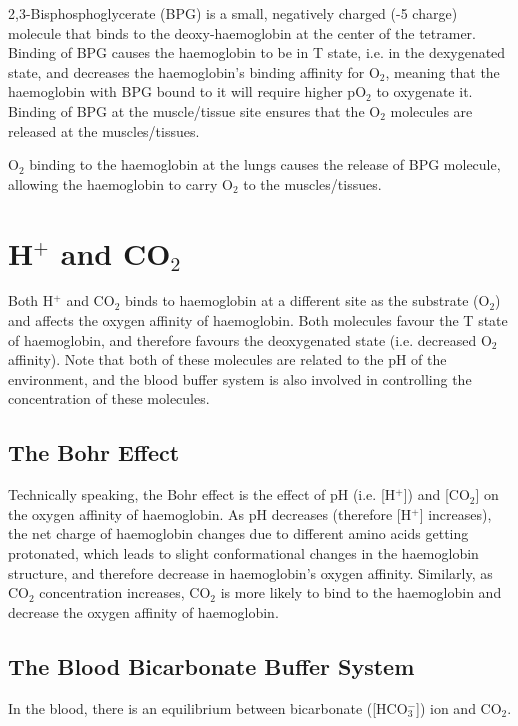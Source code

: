 \documentclass[a4paper, 12pt]{report}
\begin{document}
2,3-Bisphosphoglycerate (BPG) is a small, negatively charged (-5 charge) molecule that binds to the deoxy-haemoglobin at the center of the tetramer.
Binding of BPG causes the haemoglobin to be in T state, i.e. in the dexygenated state, and decreases the haemoglobin's binding affinity for O$_2$, meaning that the haemoglobin with BPG bound to it will require higher pO$_2$ to oxygenate it.
Binding of BPG at the muscle/tissue site ensures that the O$_2$ molecules are released at the muscles/tissues.

O$_2$ binding to the haemoglobin at the lungs causes the release of BPG molecule, allowing the haemoglobin to carry O$_2$ to the muscles/tissues.

\section{H$^+$ and CO$_2$}

Both H$^+$ and CO$_2$ binds to haemoglobin at a different site as the substrate (O$_2$) and affects the oxygen affinity of haemoglobin.
Both molecules favour the T state of haemoglobin, and therefore favours the deoxygenated state (i.e. decreased O$_2$ affinity).
Note that both of these molecules are related to the pH of the environment, and the blood buffer system is also involved in controlling the concentration of these molecules.

\subsection{The Bohr Effect}

Technically speaking, the Bohr effect is the effect of pH (i.e. [H$^+$]) and [CO$_2$] on the oxygen affinity of haemoglobin.
As pH decreases (therefore [H$^+$] increases), the net charge of haemoglobin changes due to different amino acids getting protonated, which leads to slight conformational changes in the haemoglobin structure, and therefore decrease in haemoglobin's oxygen affinity.
Similarly, as CO$_2$ concentration increases, CO$_2$ is more likely to bind to the haemoglobin and decrease the oxygen affinity of haemoglobin.

\subsection{The Blood Bicarbonate Buffer System}

In the blood, there is an equilibrium between bicarbonate ([HCO$_3^-$]) ion and CO$_2$.
\end{document}
